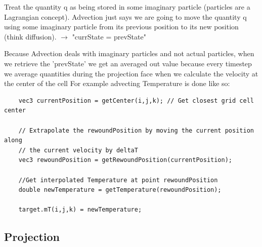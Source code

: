 \documentclass[11pt,letterpaper]{article}
\begin{document}
    Treat the quantity q as being stored in some imaginary particle (particles are a Lagrangian concept). Advection just says we are going to move the quantity q using some imaginary particle from its previous position to its new position (think diffusion). \newline
	\hspace{10mm} $\rightarrow$ "currState = prevState"
	\newline \newline
    
Because Advection deals with imaginary particles and not actual particles, when we retrieve the 'prevState' we get an averaged out value because every timestep we average quantities during the projection face when we calculate the velocity at the center of the cell
	\newline \newline
    For example advecting Temperature is done like so:
    
    \begin{lstlisting}
    vec3 currentPosition = getCenter(i,j,k); // Get closest grid cell center
    
    // Extrapolate the rewoundPosition by moving the current position along 
    // the current velocity by deltaT
    vec3 rewoundPosition = getRewoundPosition(currentPosition);
    
    //Get interpolated Temperature at point rewoundPosition
    double newTemperature = getTemperature(rewoundPosition); 
    
    target.mT(i,j,k) = newTemperature;
    \end{lstlisting}
    
\subsection{Projection}
\end{document}
